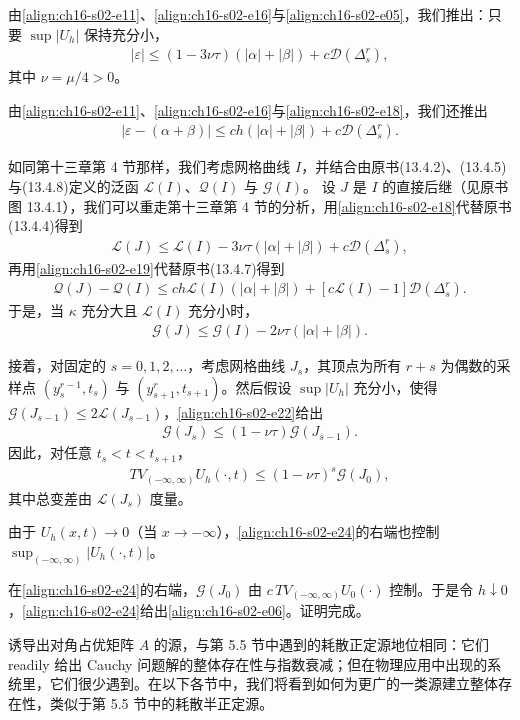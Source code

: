 \documentclass[../../main.tex]{subfiles}
\begin{document}
由\eqref{align:ch16-s02-e11}、\eqref{align:ch16-s02-e16}与\eqref{align:ch16-s02-e05}，我们推出：只要 $\sup|U_h|$ 保持充分小，
\begin{align}
|\varepsilon|\leqslant(1-3\nu\tau)(|\alpha|+|\beta|)+c\mathscr{D}(\Delta_s^r),
\label{align:ch16-s02-e18}
\end{align}
其中 $\nu=\mu/4>0$。

由\eqref{align:ch16-s02-e11}、\eqref{align:ch16-s02-e16}与\eqref{align:ch16-s02-e18}，我们还推出
\begin{align}
|\varepsilon-(\alpha+\beta)|\leqslant ch(|\alpha|+|\beta|)+c\mathscr{D}(\Delta_s^r).
\label{align:ch16-s02-e19}
\end{align}

如同第十三章第 4 节那样，我们考虑网格曲线 $I$，并结合由原书(13.4.2)、(13.4.5)与(13.4.8)定义的泛函 $\mathscr{L}(I)$、$\mathscr{Q}(I)$ 与 $\mathscr{G}(I)$。
设 $J$ 是 $I$ 的直接后继（见原书图 13.4.1），我们可以重走第十三章第 4 节的分析，用\eqref{align:ch16-s02-e18}代替原书(13.4.4)得到
\begin{align}
\mathscr{L}(J)\leqslant\mathscr{L}(I)-3\nu\tau(|\alpha|+|\beta|)+c\mathscr{D}(\Delta_s^r),
\label{align:ch16-s02-e20}
\end{align}
再用\eqref{align:ch16-s02-e19}代替原书(13.4.7)得到
\begin{align}
\mathscr{Q}(J)-\mathscr{Q}(I)\leqslant ch\mathscr{L}(I)(|\alpha|+|\beta|)+[c\mathscr{L}(I)-1]\mathscr{D}(\Delta_s^r).
\label{align:ch16-s02-e21}
\end{align}
于是，当 $\kappa$ 充分大且 $\mathscr{L}(I)$ 充分小时，
\begin{align}
\mathscr{G}(J)\leqslant\mathscr{G}(I)-2\nu\tau(|\alpha|+|\beta|).
\label{align:ch16-s02-e22}
\end{align}

接着，对固定的 $s=0,1,2,\ldots$，考虑网格曲线 $J_s$，其顶点为所有 $r+s$ 为偶数的采样点 $(y_s^{r-1},t_s)$ 与 $(y_{s+1}^r,t_{s+1})$。然后假设 $\sup|U_h|$ 充分小，使得 $\mathscr{G}(J_{s-1})\leqslant2\mathscr{L}(J_{s-1})$，\eqref{align:ch16-s02-e22}给出
\begin{align}
\mathscr{G}(J_s)\leqslant(1-\nu\tau)\mathscr{G}(J_{s-1}).
\label{align:ch16-s02-e23}
\end{align}
因此，对任意 $t_s<t<t_{s+1}$，
\begin{align}
TV_{(-\infty,\infty)}U_h(\cdot,t)\leqslant(1-\nu\tau)^s\mathscr{G}(J_0),
\label{align:ch16-s02-e24}
\end{align}
其中总变差由 $\mathscr{L}(J_s)$ 度量。

由于 $U_h(x,t)\to0$（当 $x\to-\infty$），\eqref{align:ch16-s02-e24}的右端也控制 $\sup_{(-\infty,\infty)}|U_h(\cdot,t)|$。

在\eqref{align:ch16-s02-e24}的右端，$\mathscr{G}(J_0)$ 由 $c\,TV_{(-\infty,\infty)}U_0(\cdot)$ 控制。于是令 $h\downarrow0$，\eqref{align:ch16-s02-e24}给出\eqref{align:ch16-s02-e06}。证明完成。

诱导出对角占优矩阵 $A$ 的源，与第 5.5 节中遇到的耗散正定源地位相同：它们 readily 给出 Cauchy 问题解的整体存在性与指数衰减；但在物理应用中出现的系统里，它们很少遇到。在以下各节中，我们将看到如何为更广的一类源建立整体存在性，类似于第 5.5 节中的耗散半正定源。
\end{document}
